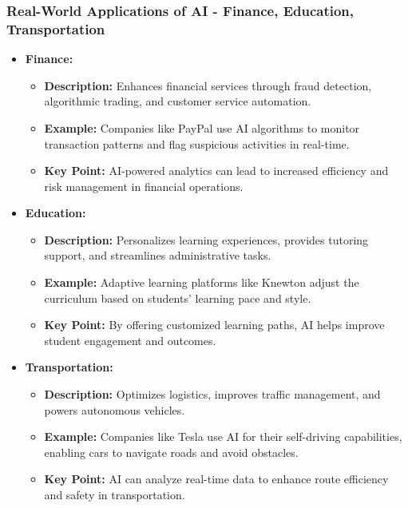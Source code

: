 \documentclass[aspectratio=169]{beamer}
\begin{document}
\begin{frame}[fragile]
    \frametitle{Real-World Applications of AI - Finance, Education, Transportation}
    \begin{itemize}
        \item \textbf{Finance:}
            \begin{itemize}
                \item \textbf{Description:} Enhances financial services through fraud detection, algorithmic trading, and customer service automation.
                \item \textbf{Example:} Companies like PayPal use AI algorithms to monitor transaction patterns and flag suspicious activities in real-time.
                \item \textbf{Key Point:} AI-powered analytics can lead to increased efficiency and risk management in financial operations.
            \end{itemize}

        \item \textbf{Education:}
            \begin{itemize}
                \item \textbf{Description:} Personalizes learning experiences, provides tutoring support, and streamlines administrative tasks.
                \item \textbf{Example:} Adaptive learning platforms like Knewton adjust the curriculum based on students' learning pace and style.
                \item \textbf{Key Point:} By offering customized learning paths, AI helps improve student engagement and outcomes.
            \end{itemize}
        
        \item \textbf{Transportation:}
            \begin{itemize}
                \item \textbf{Description:} Optimizes logistics, improves traffic management, and powers autonomous vehicles.
                \item \textbf{Example:} Companies like Tesla use AI for their self-driving capabilities, enabling cars to navigate roads and avoid obstacles.
                \item \textbf{Key Point:} AI can analyze real-time data to enhance route efficiency and safety in transportation.
            \end{itemize}
    \end{itemize}
\end{frame}
\end{document}
